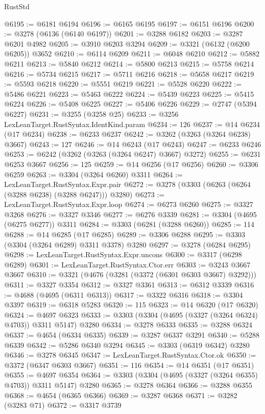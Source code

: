 \begin{lexlean}{RustStd}
\begin{coremodule}
{\begin{coremodule}
{{{{{{{{{{{{{{{{{{{{{{{{{{{{{{{{{@6195 := @6181 @6194
@6196 := @6165 @6195
@6197 := @6151 @6196
@6200 := @3278 (@6136 (@6140 @6197))
@6201 := @3288 @6182
@6203 := @3287 @6201 @4982
@6205 := @3910 @6203 @3294
@6209 := @3321 (@6132 (@6200 @6205)) @3652
@6210 := @6114 @6209
@6211 := @6048 @6210
@6212 := @5882 @6211
@6213 := @5840 @6212
@6214 := @5800 @6213
@6215 := @5758 @6214
@6216 := @5734 @6215
@6217 := @5711 @6216
@6218 := @5658 @6217
@6219 := @5593 @6218
@6220 := @5551 @6219
@6221 := @5528 @6220
@6222 := @5486 @6221
@6223 := @5463 @6222
@6224 := @5439 @6223
@6225 := @5415 @6224
@6226 := @5408 @6225
@6227 := @5406 @6226
@6229 := @2747 (@5394 @6227)
@6231 := @3255 (@3258 @25)
@6233 := @3256 LexLeanTarget.RustSyntax.IdentKind.param
@6234 := 126
@6237 := @14 @6234 (@17 @6234)
@6238 := @6233 @6237
@6242 := @3262 (@3263 (@3264 @6238) @3667)
@6243 := 127
@6246 := @14 @6243 (@17 @6243)
@6247 := @6233 @6246
@6253 := @6242 (@3262 (@3263 (@3264 @6247) @3667) @3272)
@6255 := @6231 @6253 @3667
@6256 := 125
@6259 := @14 @6256 (@17 @6256)
@6260 := @3306 @6259
@6263 := @3304 (@3264 @6260) @3311
@6264 := LexLeanTarget.RustSyntax.Expr.pair
@6272 := @3278 (@3303 (@6263 (@6264 (@3288 @6238) (@3288 @6247))) @3280)
@6273 := LexLeanTarget.RustSyntax.Expr.loop
@6274 := @6273 @6260
@6275 := @3327 @3268
@6276 := @3327 @3346
@6277 := @6276 @3339
@6281 := @3304 (@4695 (@6275 @6277)) @3311
@6284 := @3303 (@6281 (@3288 @6260))
@6285 := 114
@6288 := @14 @6285 (@17 @6285)
@6289 := @3306 @6288
@6295 := @3303 (@3304 (@3264 @6289) @3311 @3378) @3280
@6297 := @3278 (@6284 @6295)
@6298 := LexLeanTarget.RustSyntax.Expr.uncons
@6300 := @3317 (@6298 @6289)
@6301 := LexLeanTarget.RustSyntax.Ctor.err
@6303 := @3243 @3667 @3667
@6310 := @3321 (@4676 (@3281 (@3372 (@6301 @6303 @3667) @3292)))
@6311 := @3327 @3354
@6312 := @3327 @3361
@6313 := @6312 @3339
@6316 := @4688 (@4695 (@6311 @6313))
@6317 := @3322 @6316
@6318 := @3304 @3397
@6319 := @6318 @5283
@6320 := 115
@6323 := @14 @6320 (@17 @6320)
@6324 := @4697 @6323
@6333 := @3303 (@3304 (@4695 (@3327 (@3264 @6324) @4703)) @3311 @5147) @3280
@6334 := @3278 @6333
@6335 := @3288 @6324
@6337 := @4654 (@6334 @6335)
@6339 := @3287 @6337 @3291
@6340 := @5288 @6339
@6342 := @5286 @6340 @3294
@6345 := @3303 (@6319 @6342) @3280
@6346 := @3278 @6345
@6347 := LexLeanTarget.RustSyntax.Ctor.ok
@6350 := @3372 (@6347 @6303 @3667)
@6351 := 116
@6354 := @14 @6351 (@17 @6351)
@6355 := @4697 @6354
@6364 := @3303 (@3304 (@4695 (@3327 (@3264 @6355) @4703)) @3311 @5147) @3280
@6365 := @3278 @6364
@6366 := @3288 @6355
@6368 := @4654 (@6365 @6366)
@6369 := @3287 @6368
@6371 := @3282 (@3283 @71)
@6372 := @3317 @3739
}}}}}}}}}}}}}}}}}}}}}}}}}}}}}}}}}
\end{coremodule}}
\end{coremodule}
\end{lexlean}
